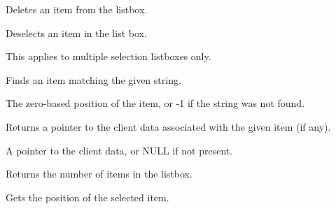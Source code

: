 
Deletes an item from the listbox.



\label{wxlistboxdeselect}


Deselects an item in the list box.




This applies to multiple selection listboxes only.

\label{wxlistboxfindstring}


Finds an item matching the given string.




The zero-based position of the item, or -1 if the string was not found.

\label{wxlistboxgetclientdata}


Returns a pointer to the client data associated with the given item (if any).




A pointer to the client data, or NULL if not present.

\label{wxlistboxgetcount}


Returns the number of items in the listbox.

\label{wxlistboxgetselection}


Gets the position of the selected item.

